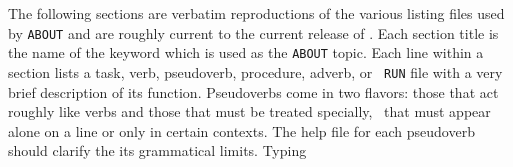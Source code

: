      The following sections are verbatim reproductions of the various
listing files used by {\tt ABOUT} and are roughly current to the
current release of \hbox{\AIPS}.  Each section title is the name of
the keyword which is used as the {\tt ABOUT} topic.  Each line within
a section lists a task, verb, pseudoverb, procedure, adverb, or {\tt
RUN} file with a very brief description of its function.  Pseudoverbs
come in two flavors: those that act roughly like verbs and those that
must be treated specially, \ie\ that must appear alone on a line or
only in certain contexts.  The help file for each pseudoverb should
clarify the its grammatical limits.  Typing

\small
{}

